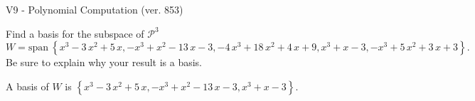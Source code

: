 \begin{exercise}
  \begin{exerciseTitle}V9 - Polynomial Computation (ver. 853)\end{exerciseTitle}
  \begin{exerciseStatement}
    Find a basis for the subspace of \(\mathcal{P}^3\) 
\[W=\mathrm{span}\ \left\{x^{3} - 3 \, x^{2} + 5 \, x , -x^{3} + x^{2} - 13 \, x - 3 , -4 \, x^{3} + 18 \, x^{2} + 4 \, x + 9 , x^{3} + x - 3 , -x^{3} + 5 \, x^{2} + 3 \, x + 3\right\}.\]
 Be sure to explain why your result is a basis.


  \end{exerciseStatement}
  \begin{exerciseAnswer}
   A basis of \(W\) is  \(\left\{x^{3} - 3 \, x^{2} + 5 \, x , -x^{3} + x^{2} - 13 \, x - 3 , x^{3} + x - 3\right\}\).
  


  \end{exerciseAnswer}
\end{exercise}